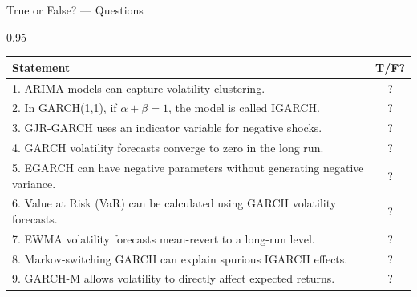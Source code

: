 \documentclass[9pt, aspectratio=169, t]{beamer}
\begin{document}
\begin{frame}{True or False? --- Questions}
    \begin{cminipage}{0.95\textwidth}
    \footnotesize
    \begin{center}
    \begin{tabular}{p{9cm}c}
        \toprule
        \textbf{Statement} & \textbf{T/F?} \\
        \midrule
        1. ARIMA models can capture volatility clustering. & ? \\[0.15cm]
        2. In GARCH(1,1), if $\alpha + \beta = 1$, the model is called IGARCH. & ? \\[0.15cm]
        3. GJR-GARCH uses an indicator variable for negative shocks. & ? \\[0.15cm]
        4. GARCH volatility forecasts converge to zero in the long run. & ? \\[0.15cm]
        5. EGARCH can have negative parameters without generating negative variance. & ? \\[0.15cm]
        6. Value at Risk (VaR) can be calculated using GARCH volatility forecasts. & ? \\[0.15cm]
        7. EWMA volatility forecasts mean-revert to a long-run level. & ? \\[0.15cm]
        8. Markov-switching GARCH can explain spurious IGARCH effects. & ? \\[0.15cm]
        9. GARCH-M allows volatility to directly affect expected returns. & ? \\
        \bottomrule
    \end{tabular}
    \end{center}
    \end{cminipage}
\end{frame}
\end{document}
